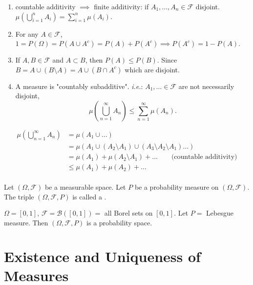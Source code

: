 \documentclass[class=article,crop=false]{standalone}
\begin{document}
\begin{note}
\begin{enumerate}
	\item countable additivity $\implies$ finite additivity: if $A_1,\ldots,A_n \in \mathcal{F}$ disjoint. $\mu\left( \bigcup_{i= 1}^{ n} A_i \right) = \sum_{ i=1}^{ n} \mu(A_i)$.
	\item For any $A\in \mathcal{F}$, $1=P(\Omega)=P(A \cup A^{c}) = P(A) + P(A^{c}) \implies P(A^{c})=1-P(A)$.
	\item If $A,B \in \mathcal{F}$ and $A \subset B$, then $P(A) \leq P(B)$. Since $B=A \cup (B \setminus A) = A \cup (B \cap A^{c})$ which are disjoint.
	\item A measure is "countably subadditive". \emph{i.e.}: $A_1,\ldots \in \mathcal{F}$ are not necessarily disjoint, 
		\[
			\mu\left( \bigcup_{n= 1}^{\infty} A_n  \right) \leq \sum_{ n=1}^{\infty} \mu(A_n)
		.\] 
\end{enumerate}
\begin{prf}
\begin{align*}
	\mu\left( \bigcup_{n= 1}^{\infty} A_n \right) &= \mu(A_1 \cup \ldots) \\
						      &= \mu(A_1 \cup (A_2 \setminus A_1) \cup (A_3 \setminus A_2 \setminus A_1) \ldots) \\
						      &= \mu(A_1) + \mu(A_2 \setminus A_1) + \ldots \qquad  \text{(countable additivity)}  \\
						      &\leq \mu(A_1) + \mu(A_2) + \ldots  \\
\end{align*}
\end{prf}
\end{note}

\begin{defn}
	Let $(\Omega,\mathcal{F})$ be a measurable space. Let $P$ be a probability measure on  $(\Omega,\mathcal{F})$. The triple $(\Omega,\mathcal{F},P)$ is called a .
\end{defn}
\begin{eg}[]
	$\Omega=[0,1]$, $\mathcal{F}=\mathcal{B}([0,1]) =$ all Borel sets on $[0,1]$. Let $P =$ Lebesgue measure. Then $(\Omega,\mathcal{F},P)$ is a probability space.  
\end{eg}

\section{Existence and Uniqueness of Measures}
\end{document}
